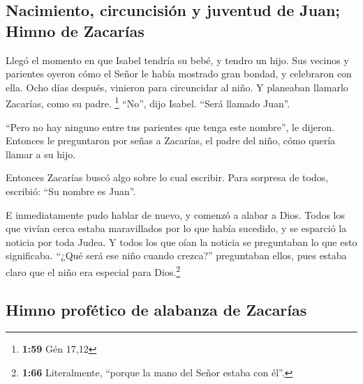 \hypertarget{nacimiento-circuncisiuxf3n-y-juventud-de-juan-himno-de-zacaruxedas}{%
\subsection{Nacimiento, circuncisión y juventud de Juan; Himno de
Zacarías}\label{nacimiento-circuncisiuxf3n-y-juventud-de-juan-himno-de-zacaruxedas}}

 Llegó el momento en que Isabel tendría su bebé, y tendro
un hijo.  Sus vecinos y parientes oyeron cómo el Señor le
había mostrado gran bondad, y celebraron con ella.  Ocho
días después, vinieron para circuncidar al niño. Y planeaban llamarlo
Zacarías, como su padre. \footnote{\textbf{1:59} Gén 17,12}
 ``No'', dijo Isabel. ``Será llamado Juan''.

 ``Pero no hay ninguno entre tus parientes que tenga este
nombre'', le dijeron.  Entonces le preguntaron por señas
a Zacarías, el padre del niño, cómo quería llamar a su hijo.

 Entonces Zacarías buscó algo sobre lo cual escribir.
Para sorpresa de todos, escribió: ``Su nombre es Juan''.

 E inmediatamente pudo hablar de nuevo, y comenzó a
alabar a Dios.  Todos los que vivían cerca estaba
maravillados por lo que había sucedido, y se esparció la noticia por
toda Judea.  Y todos los que oían la noticia se
preguntaban lo que esto significaba. ``¿Qué será ese niño cuando
crezca?'' preguntaban ellos, pues estaba claro que el niño era especial
para Dios.\footnote{\textbf{1:66} Literalmente, ``porque la mano del
  Señor estaba con él''.}

\hypertarget{himno-profuxe9tico-de-alabanza-de-zacaruxedas}{%
\subsection{Himno profético de alabanza de
Zacarías}\label{himno-profuxe9tico-de-alabanza-de-zacaruxedas}}

